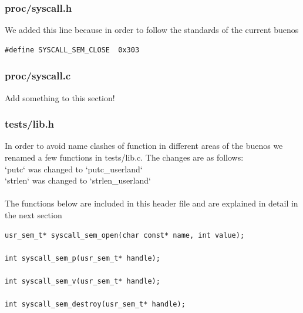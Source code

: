 \documentclass[a4paper,12pt,danish]{report}
\begin{document}
\subsubsection{proc/syscall.h}
We added this line because in order to follow the standards of the current buenos
\begin{verbatim}
#define SYSCALL_SEM_CLOSE  0x303
\end{verbatim}
\subsubsection{proc/syscall.c}
Add something to this section!
\subsubsection{tests/lib.h}
In order to avoid name clashes of function in different areas of the buenos we renamed a few functions in tests/lib.c. The changes are as follows:
\\
`putc` was changed to `putc\_userland`\\
`strlen` was changed to `strlen\_userland`
\\
\\
The functions below are included in this header file and are explained in detail in the next section
\begin{verbatim}
usr_sem_t* syscall_sem_open(char const* name, int value);

int syscall_sem_p(usr_sem_t* handle);

int syscall_sem_v(usr_sem_t* handle);

int syscall_sem_destroy(usr_sem_t* handle);
\end{verbatim}
\end{document}
